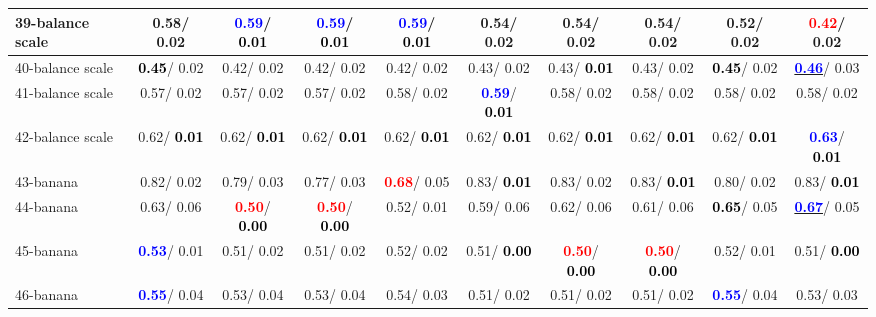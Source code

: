 \begin{table}[h]
\begin{center}
{\begin{tabular}{lc|c|c|c|c|c|c|c|c}
39-balance scale &   0.58/  0.02 & \textcolor{blue}{\textbf{  0.59}}/\textcolor{black}{\textbf{  0.01}} & \textcolor{blue}{\textbf{  0.59}}/\textcolor{black}{\textbf{  0.01}} & \textcolor{blue}{\textbf{  0.59}}/\textcolor{black}{\textbf{  0.01}} &   0.54/  0.02 &   0.54/  0.02 &   0.54/  0.02 &   0.52/  0.02 & \textcolor{red}{\textbf{  0.42}}/  0.02 \\ \hline
40-balance scale & \textcolor{black}{\textbf{  0.45}}/  0.02 &   0.42/  0.02 &   0.42/  0.02 &   0.42/  0.02 &   0.43/  0.02 &   0.43/\textcolor{black}{\textbf{  0.01}} &   0.43/  0.02 & \textcolor{black}{\textbf{  0.45}}/  0.02 & \underline{\textcolor{blue}{\textbf{  0.46}}}/  0.03 \\
41-balance scale &   0.57/  0.02 &   0.57/  0.02 &   0.57/  0.02 &   0.58/  0.02 & \textcolor{blue}{\textbf{  0.59}}/\textcolor{black}{\textbf{  0.01}} &   0.58/  0.02 &   0.58/  0.02 &   0.58/  0.02 &   0.58/  0.02 \\
42-balance scale &   0.62/\textcolor{black}{\textbf{  0.01}} &   0.62/\textcolor{black}{\textbf{  0.01}} &   0.62/\textcolor{black}{\textbf{  0.01}} &   0.62/\textcolor{black}{\textbf{  0.01}} &   0.62/\textcolor{black}{\textbf{  0.01}} &   0.62/\textcolor{black}{\textbf{  0.01}} &   0.62/\textcolor{black}{\textbf{  0.01}} &   0.62/\textcolor{black}{\textbf{  0.01}} & \textcolor{blue}{\textbf{  0.63}}/\textcolor{black}{\textbf{  0.01}} \\
43-banana &   0.82/  0.02 &   0.79/  0.03 &   0.77/  0.03 & \textcolor{red}{\textbf{  0.68}}/  0.05 &   0.83/\textcolor{black}{\textbf{  0.01}} &   0.83/  0.02 &   0.83/\textcolor{black}{\textbf{  0.01}} &   0.80/  0.02 &   0.83/\textcolor{black}{\textbf{  0.01}} \\
44-banana &   0.63/  0.06 & \textcolor{red}{\textbf{  0.50}}/\textcolor{black}{\textbf{  0.00}} & \textcolor{red}{\textbf{  0.50}}/\textcolor{black}{\textbf{  0.00}} &   0.52/  0.01 &   0.59/  0.06 &   0.62/  0.06 &   0.61/  0.06 & \textcolor{black}{\textbf{  0.65}}/  0.05 & \underline{\textcolor{blue}{\textbf{  0.67}}}/  0.05 \\
45-banana & \textcolor{blue}{\textbf{  0.53}}/  0.01 &   0.51/  0.02 &   0.51/  0.02 &   0.52/  0.02 &   0.51/\textcolor{black}{\textbf{  0.00}} & \textcolor{red}{\textbf{  0.50}}/\textcolor{black}{\textbf{  0.00}} & \textcolor{red}{\textbf{  0.50}}/\textcolor{black}{\textbf{  0.00}} &   0.52/  0.01 &   0.51/\textcolor{black}{\textbf{  0.00}} \\
46-banana & \textcolor{blue}{\textbf{  0.55}}/  0.04 &   0.53/  0.04 &   0.53/  0.04 &   0.54/  0.03 &   0.51/  0.02 &   0.51/  0.02 &   0.51/  0.02 & \textcolor{blue}{\textbf{  0.55}}/  0.04 &   0.53/  0.03 \\ \hline

\end{tabular}}
\end{center}
\end{table}
